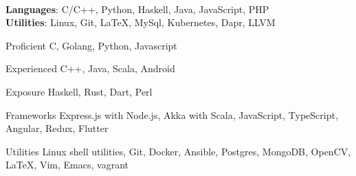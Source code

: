 \vspace{-0.2cm}
\ifdefined\ONEPAGE
\\
\vspace{-0.1cm}
\textbf{Languages}: C/C++, Python, Haskell, Java, JavaScript, PHP\\
\vspace{0.05cm}
\textbf{Utilities}: Linux, Git, \LaTeX, MySql, Kubernetes, Dapr, LLVM


\else
\begin{cvskills}

  \cvskill
  {Proficient}
  {C, Golang, Python, Javascript}

  \cvskill
  {Experienced}
  {C++, Java, Scala, Android}
  
  \cvskill
  {Exposure}
  {Haskell, Rust, Dart, Perl}
  
  \cvskill
  {Frameworks}
  {Express.js with Node.js, Akka with Scala, JavaScript, TypeScript, Angular,
    Redux, Flutter}

  \cvskill
  {Utilities}
  {Linux shell utilities, Git, Docker, Ansible, Postgres,
    MongoDB, OpenCV, \LaTeX, Vim, Emacs, vagrant}

\end{cvskills}
\fi

